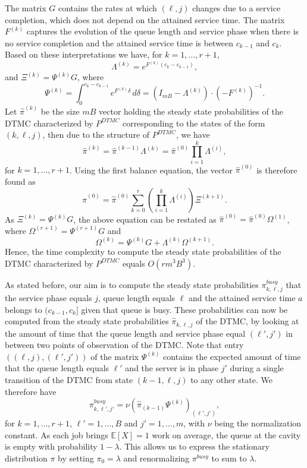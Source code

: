 \documentclass[12pt]{report}
\newcommand{\E}{\mathbb{E}}
\begin{document}
The matrix $G$ contains the rates at which 
$(\ell,j)$ changes due to a service completion, which does not depend on
the attained service time.
The matrix $F^{(k)}$ 
captures the evolution of the queue length and service phase 
when there is no service completion and 
the attained service time is between
$c_{k-1}$ and $c_k$. 
Based on these interpretations we have, for $k=1,\ldots,r+1$,
\begin{equation}\label{eq:Lambdak}
\Lambda^{(k)}=e^{F^{(k)} (c_k-c_{k-1})},
\end{equation} 
and $\Xi^{(k)} = \Psi^{(k)} G$, where
\begin{equation}\label{eq:Psik}
\Psi^{(k)} = \int_{0}^{c_k-c_{k-1}} e^{F^{(k)} \delta} \, d\delta = (I_{mB} - \Lambda^{(k)}) \cdot (-F^{(k)})^{-1}.
\end{equation}
Let $\hat \pi^{(k)}$ be the size $mB$ vector holding the steady state probabilities of
the DTMC characterized by $P^{DTMC}$ corresponding to the states of the
form $(k,\ell,j)$, then due to the structure of $P^{DTMC}$, we have
\[\hat \pi^{(k)} = \hat \pi^{(k-1)} \Lambda^{(k)} = \hat \pi^{(0)}  \prod_{i=1}^k \Lambda^{(i)},\]
for $k=1,\ldots,r+1$. Using the first balance equation, the vector $\hat \pi^{(0)} $
is therefore found as 
\[ \hat \pi^{(0)}  = \hat \pi^{(0)} \sum_{k=0}^{r} \left( \prod_{i=1}^k \Lambda^{(i)}\right) \Xi^{(k+1)}.\]
As $\Xi^{(k)} = \Psi^{(k)} G$, the above equation can be restated as $\hat \pi^{(0)}  = \hat \pi^{(0)} \Omega^{(1)}$, where
$\Omega^{(r+1)} = \Psi^{(r+1)} G$ and 
\[ \Omega^{(k)} =  \Psi^{(k)} G + \Lambda^{(k)} \Omega^{(k+1)}. \]
Hence, the time complexity to compute the steady state probabilities of the DTMC
characterized by $P^{DTMC}$ equals $O(r m^3 B^3)$.

As stated before, our aim is to compute the steady state probabilities  
 $\pi^{busy}_{k,\ell,j}$ that the service phase equals $j$, queue length equals $\ell$ and the attained service time $a$ belongs to $(c_{k-1},c_k]$ given that queue is busy. 
 These probabilities can now be computed from the steady state probabilities
$\hat \pi_{k,\ell,j}$ of the DTMC, by looking at the amount of time that the
queue length and service phase equal $(\ell',j')$ in  between
two points of observation of the DTMC. Note that
entry $((\ell,j),(\ell',j'))$ of the matrix $\Psi^{(k)}$ contains the 
expected amount of time that the queue length equals $\ell'$ and the server
is in phase $j'$ during a single transition of the DTMC from state
$(k-1,\ell,j)$ to any other state. We therefore have
\[ \pi^{busy}_{k,\ell',j'} = \nu ( \hat  \pi_{(k-1)} \Psi^{(k)})_{(\ell',j')},
\] 
for $k=1,\ldots,r+1$, $\ell' = 1,\ldots,B$ and $j'=1,\ldots,m$, with $\nu$ 
being the normalization constant. As each job brings $\E[X]=1$ work on average, the queue at
the cavity is empty with probability $1-\lambda$. This allows us to express the stationary distribution $\pi$ by setting $\pi_0=\lambda$ and renormalizing $\pi^{busy}$ to sum to $\lambda$.
\end{document}
